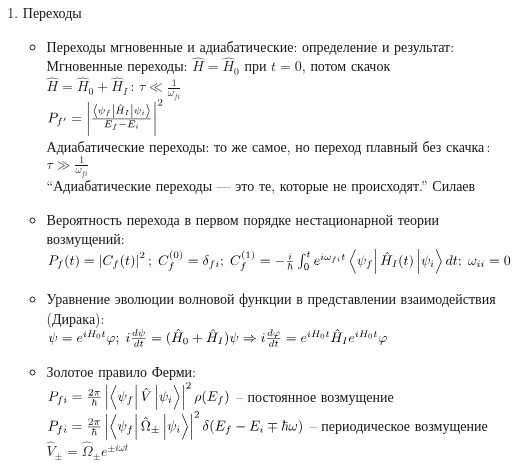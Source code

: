 \begin{enumerate}[label=\textbf{\underline{\arabic*.}}]
\begin{itemize}
        \end{itemize}
\item Переходы  \begin{itemize}
            \item Переходы мгновенные и адиабатические: определение и результат: \\
            Мгновенные переходы: $ \hat{H} = \hat{H}_0 $ при $ t=0 $, потом скачок $ \hat{H} = \hat{H}_0 + \hat{H}_I\,:\, \tau \ll \frac1{\omega_{fi}} $ \\
            $ P_{f'} = \abs{\frac{\matrixel{\psi_f}{\hat{H}_I}{\psi_i}}{E_f-E_i}}^2 $ \\
            Адиабатические переходы: то же самое, но переход плавный без скачка\,:\, $ \tau \gg \frac1{\omega_{fi}} $\\
            ``Адиабатические переходы --- это те, которые не происходят.'' Силаев
            \item Вероятность перехода в первом порядке нестационарной теории возмущений: \\
            $ P_f(t) = \abs{C_f(t)}^2;\; C_f^{(0)}=\delta_{fi};\; C_f^{(1)}=-\frac{i}{\hbar}\int_0^t e^{i\omega_{fi}t}\matrixel{\psi_f}{\hat{H}_I(t)}{\psi_i}dt;\;\omega_{ii}=0 $
            \item Уравнение эволюции волновой функции в представлении взаимодействия (Дирака): \\
            $ \psi=e^{iH_0t}\varphi;\; i\frac{d \psi}{d t}=(\hat{H}_0+\hat{H}_I)\psi \Rightarrow i\frac{d \varphi}{d t}=e^{iH_0t}\hat{H}_I e^{iH_0t}\varphi $
            \item Золотое правило Ферми: \\
            $ P_{fi} = \frac{2\pi}{\hbar}\abs{\matrixel{\psi_f}{\hat{V}}{\psi_i}}^2\rho(E_f) $ -- постоянное возмущение\\
            $ P_{fi} = \frac{2\pi}{\hbar}\abs{\matrixel{\psi_f}{\hat{\Omega}_\pm}{\psi_i}}^2\delta(E_f-E_i\mp \hbar\omega) $ -- периодическое возмущение $ \hat{V}_\pm=\hat{\Omega}_\pm e^{\pm i\omega t} $


\end{itemize}
\end{enumerate}
